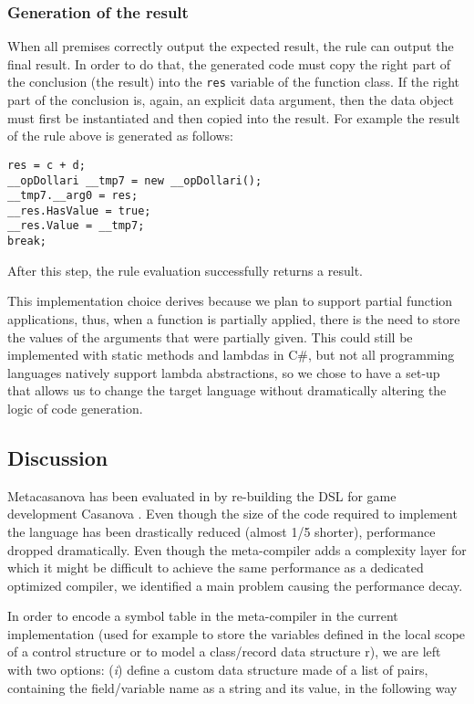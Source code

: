 \subsubsection{Generation of the result}
When all premises correctly output the expected result, the rule can output the final result. In order to do that, the generated code must copy the right part of the conclusion (the result) into the \texttt{\tu\tu res} variable of the function class. If the right part of the conclusion is, again, an explicit data argument, then the data object must first be instantiated and then copied into the result. For example the result of the rule above is generated as follows:

\begin{lstlisting}
res = c + d;
__opDollari __tmp7 = new __opDollari();
__tmp7.__arg0 = res;
__res.HasValue = true;
__res.Value = __tmp7;
break;
\end{lstlisting}

\noindent
After this step, the rule evaluation successfully returns a result.

This implementation choice derives because we plan to support partial function applications, thus, when a function is partially applied, there is the need to store the values of the arguments that were partially given. This could still be implemented with static methods and lambdas in C\#, but not all programming languages natively support lambda abstractions, so we chose to have a set-up that allows us to change the target language without dramatically altering the logic of code generation.

\subsection{Discussion}
\label{subsec:code_generation_discussion}
Metacasanova has been evaluated in \cite{DiGiacomo2017} by re-building the DSL for game development Casanova \cite{abbadi2015casanova, abbadithesis2017}. Even though the size of the code required to implement the language has been drastically reduced (almost 1/5 shorter), performance dropped dramatically. Even though the meta-compiler adds a complexity layer for which it might be difficult to achieve the same performance as a dedicated optimized compiler, we identified a main problem causing the performance decay.

In order to encode a symbol table in the meta-compiler in the current implementation (used for example to store the variables defined in the local scope of a control structure or to model a class/record data structure r), we are left with two options: (\textit{i}) define a custom data structure made of a list of pairs, containing the field/variable name as a string and its value, in the following way

